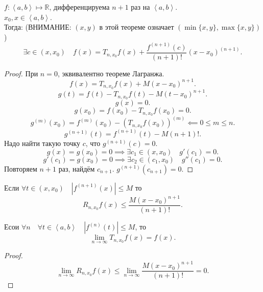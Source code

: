 \documentclass[11pt, oneside]{article}   	%
\begin{document}
    \begin{theorem}
        $f: \left<a, b\right> \mapsto \mathbb{R}$, дифференцируема $n+1$ раз на $\left<a,b\right>$.\\
        $x_0, x\in \left<a, b\right>$.\\
        Тогда:
        (ВНИМАНИЕ: $\left( x, y \right) $ в этой теореме означает $\left( \min \{x, y\}, \max \{x, y\}  \right) $)
        \[ \exists{c\in \left( x, x_0 \right) }\quad f(x) = T_{n, x_0}f(x) + \frac{f^{(n+1)}(c)}{(n+1)!}(x-x_0)^{(n+1)}  .\]
        \begin{proof}
            При $n=0$, эквивалентно теореме Лагранжа.\\
            \[ f(x) = T_{n,x_0}f(x) + M(x-x_0)^{n+1} .\] 
            \[ g(t) = f(t) - T_{n, x_0}f(t) - M(t-x_0)^{n+1} .\] 
            \[ g(x) = 0 .\]
            \[ g(x_0) = f(x_0) - T_{n, x_0}f(x_0) = 0 .\]
            \[ g^{(m)}(x_0) = f^{(m)}(x_0) - \left( T_{n, x_0}f(x_0) \right)^{(m)} \impliedby 0 \le m \le n .\]
            \[ g^{(n+1)}(t) = f^{(n+1)}(t) - M(n+1)! .\]
            Надо найти такую точку $c$, что $g^{(n+1)}(c) = 0$.\\
            \[ g(x) = g(x_0) = 0 \implies \exists{c_1\in \left( x, x_0 \right) }\quad g'(c_1) = 0 .\]
            \[ g'(c_1) = g(x_0) = 0 \implies \exists{c_2\in \left( c_1, x_0 \right) }\quad g''(c_1) = 0 .\] 
            Повторяем $n+1$ раз, найдём $c_{n+1}$. $g^{(n+1)}(c_{n+1}) = 0$.
        \end{proof}
    \end{theorem}
    \begin{tlemma}
        Если $\forall{t\in (x, x_0)}\quad |f^{(n+1)}(x)| \le M$ то
        \[ R_{n, x_0}f(x) \le \frac{M(x-x_0)^{n+1}}{(n+1)!} .\] 
    \end{tlemma}
    \begin{tlemma}
        Есои $\forall{n}\quad \forall{t\in \left<a, b\right>}\quad |f^{(n)}(t)| \le M$, то
        \[ \lim\limits_{n \to \infty} T_{n, x_0}f(x) = f(x) .\]
        \begin{proof}
            \[ \lim\limits_{n \to \infty} R_{n, x_0}f(x) \le \lim\limits_{n \to \infty} \frac{M(x-x_0)^{n+1}}{(n+1)!} = 0 .\] 
        \end{proof}
    \end{tlemma}
\end{document}
